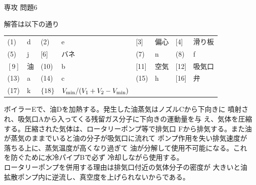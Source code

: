 \documentclass[fleqn]{jbook}
\begin{document}
\begin{answer}{専攻 問題6}{}
\begin{subanswers}
\SubAnswer
  \begin{subsubanswers}
  \SubSubAnswer
    解答は以下の通り\\
    \begin{tabular}{llllllll}
     (1)  & d  & (2)  & e     & [3]  & 偏心 & [4]  & 滑り板 \\
     (5)  & j  & [6]  & バネ  & (7)  & n    & (8)  & f      \\
     $[9]$  & 油 & (10) & b     & [11] & 空気 & [12] & 吸気口 \\
     (13) & a  & (14) & c     & (15) & h    & [16] & 弁     \\
     (17) & k  &$\{18\}$& $V_{\rm min}/(V_1+V_{2}-V_{\rm min})$ &&&& \\
    \end{tabular}

  \SubSubAnswer
    ボイラーEで、油Dを加熱する。発生した油蒸気はノズルCから下向きに
    噴射され、吸気口Aから入ってくる残留ガス分子に下向きの運動量を与
    え、気体を圧縮する。圧縮された気体は、ロータリーポンプ等で排気口
    Fから排気する。また油が蒸気のままでいると油の分子が吸気口に流れて
    ポンプ作用を失い排気速度が落ちる上に、蒸気温度が高くなり過ぎて
    油が分解して使用不可能になる。これを防ぐために水冷パイプBで必ず
    冷却しながら使用する。\\
%
    ロータリーポンプを併用する理由は排気口付近の気体分子の密度が
    大きいと油拡散ポンプ内に逆流し、真空度を上げられないからである。
  \end{subsubanswers}


\end{subanswers}
\end{answer}
\end{document}
